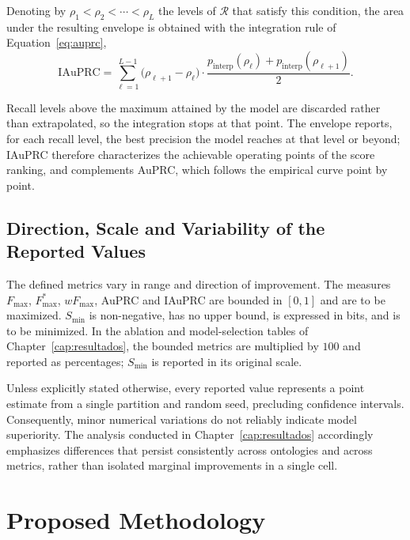 \documentclass[Ingles]{ic-tese-v3}
\begin{document}
Denoting by $\rho_1 < \rho_2 < \cdots < \rho_L$ the levels of $\mathcal{R}$ that
satisfy this condition, the area under the resulting envelope is obtained with the
integration rule of Equation~\ref{eq:auprc},
\begin{equation}
\label{eq:iauprc_area}
\mathrm{IAuPRC} = \sum_{\ell=1}^{L-1} \bigl(\rho_{\ell+1} - \rho_{\ell}\bigr)
\cdot \frac{p_{\mathrm{interp}}(\rho_{\ell}) + p_{\mathrm{interp}}(\rho_{\ell+1})}{2}.
\end{equation}

Recall levels above the maximum attained by the model are discarded rather than
extrapolated, so the integration stops at that point. The envelope reports, for
each recall level, the best precision the model reaches at that level or beyond;
IAuPRC therefore characterizes the achievable operating points of the score
ranking, and complements AuPRC, which follows the empirical curve point by point.

\section{Direction, Scale and Variability of the Reported Values}
\label{sec:escala}

The defined metrics vary in range and direction of improvement. The measures
$F_{\max}$, $F_{\max}^{*}$, $wF_{\max}$, AuPRC and IAuPRC are bounded in $[0, 1]$
and are to be maximized. $S_{\min}$ is non-negative, has no upper bound, is
expressed in bits, and is to be minimized. In the ablation and model-selection
tables of Chapter~\ref{cap:resultados}, the bounded metrics are multiplied by $100$
and reported as percentages; $S_{\min}$ is reported in its original scale.

Unless explicitly stated otherwise, every reported value represents a point
estimate from a single partition and random seed, precluding confidence intervals.
Consequently, minor numerical variations do not reliably indicate model superiority.
The analysis conducted in Chapter~\ref{cap:resultados} accordingly emphasizes
differences that persist consistently across ontologies and across metrics, rather
than isolated marginal improvements in a single cell.





\chapter{Proposed Methodology}
\label{cap:metodologia}
\end{document}
